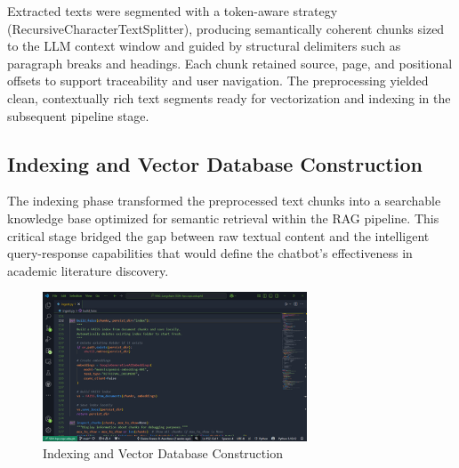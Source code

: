\begin{refsection}
Extracted texts were segmented with a token-aware strategy (RecursiveCharacterTextSplitter), producing semantically coherent chunks sized to the LLM context window and guided by structural delimiters such as paragraph breaks and headings. Each chunk retained source, page, and positional offsets to support traceability and user navigation. The preprocessing yielded clean, contextually rich text segments ready for vectorization and indexing in the subsequent pipeline stage.    

\subsection{Indexing and Vector Database Construction}
The indexing phase transformed the preprocessed text chunks into a searchable knowledge base optimized for semantic retrieval within the RAG pipeline. This critical stage bridged the gap between raw textual content and the intelligent query-response capabilities that would define the chatbot's effectiveness in academic literature discovery.

\begin{figure}[h]
    \centering
    \includegraphics[width=0.7\textwidth]{figures/indfaiss.png}
    \caption{Indexing and Vector Database Construction}
\end{figure}


\end{refsection}
